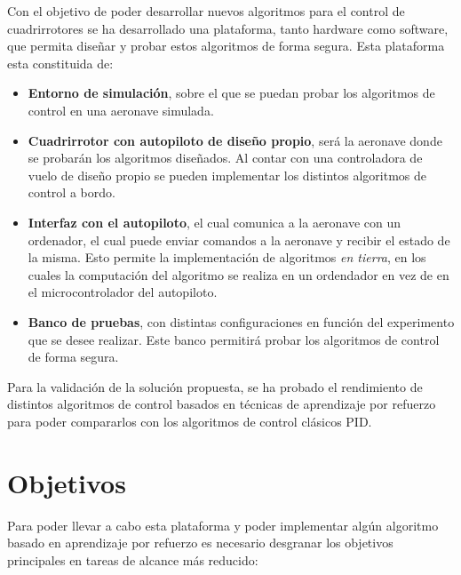 Con el objetivo de poder desarrollar nuevos algoritmos para el control de cuadrirrotores se ha desarrollado una plataforma, tanto hardware como software, que permita diseñar y probar estos algoritmos de forma segura. Esta plataforma esta constituida de:

\begin{itemize}
	\item \textbf{Entorno de simulación}, sobre el que se puedan probar los algoritmos de control en una aeronave simulada.
	\item \textbf{Cuadrirrotor con autopiloto de diseño propio}, será la aeronave donde se probarán los algoritmos diseñados. Al contar con una controladora de vuelo de diseño propio se pueden implementar los distintos algoritmos de control a bordo.
	\item \textbf{Interfaz con el autopiloto}, el cual comunica a la aeronave con un ordenador, el cual puede enviar comandos a la aeronave y recibir el estado de la misma. Esto permite la implementación de algoritmos \textit{en tierra}, en los cuales la computación del algoritmo se realiza en un ordendador en vez de en el microcontrolador del autopiloto. 
	\item \textbf{Banco de pruebas}, con distintas configuraciones en función del experimento que se desee realizar. Este banco permitirá probar los algoritmos de control de forma segura.
	
\end{itemize}


 Para la validación de la solución propuesta, se ha probado el rendimiento de distintos algoritmos de control basados en técnicas de aprendizaje por refuerzo para poder compararlos con los algoritmos de control clásicos PID.
 
 \section{Objetivos}
 Para poder llevar a cabo esta plataforma y poder implementar algún algoritmo basado en aprendizaje por refuerzo es necesario desgranar los objetivos principales en tareas de alcance más reducido:
 
